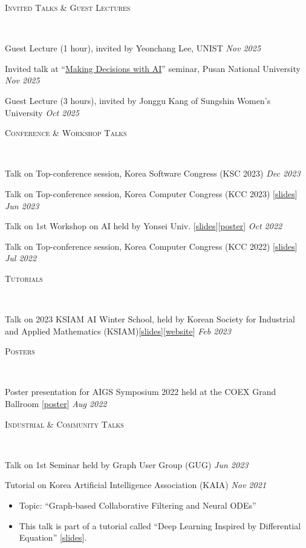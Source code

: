 \documentclass[10pt]{article}
\newenvironment{changemargin}[2]{
  \begin{list}{}{
    \setlength{\topsep}{0pt}
    \setlength{\leftmargin}{#1}
    \setlength{\rightmargin}{#2}
    \setlength{\listparindent}{\parindent}
    \setlength{\itemindent}{\parindent}
    \setlength{\parsep}{\parskip}
  }
  \item[]}{\end{list}
}
\newcommand{\lineover}{
	\begin{changemargin}{-0.05in}{-0.05in}
		\vspace*{-8pt}
		\hrulefill \\
		\vspace*{-2pt}
	\end{changemargin}
}
\newcommand{\award}[2]{
	{#1} \hfill \emph{#2}\\ \medskip
}
\newenvironment{body} {
	\vspace*{-16pt}
	\begin{changemargin}{-0.25in}{-0.5in}
  }
	{\end{changemargin}
}
\begin{document}
\begin{body}
\vspace{14pt}
\textsc{Invited Talks \& Guest Lectures
}
\lineover
\vspace{0.5em}

\award{Guest Lecture (1 hour), invited by Yeonchang Lee, UNIST} {Nov 2025}
\award{Invited talk at ``\href{https://pnu-ds.github.io}{Making Decisions with AI}'' seminar, Pusan National University} {Nov 2025}
\award{Guest Lecture (3 hours), invited by Jonggu Kang of Sungshin Women’s University} {Oct 2025}

\vspace{0.5em}
\textsc{Conference \& Workshop Talks}
\lineover
\vspace{0.5em}
\award{Talk on Top-conference session, Korea Software Congress (KSC 2023)} {Dec 2023}
\award{Talk on Top-conference session, Korea Computer Congress (KCC 2023) [\href{https://www.dropbox.com/s/34h6pmr7ftdiuzr/BSPM-KCC23.pptx?dl=0}{slides}]}{Jun 2023}
\award{Talk on 1st Workshop on AI held by Yonsei Univ. [\href{https://www.dropbox.com/s/9au5xx13qa2l529/AAAI22_workshop.pdf?dl=0}{slides}][\href{https://www.dropbox.com/s/pibzd51d76zy907/AAAI22-Yonsei_AI_Workshop.pdf?dl=0}{poster}]}{Oct 2022}
\award{Talk on Top-conference session, Korea Computer Congress (KCC 2022) [\href{https://www.dropbox.com/s/22d9d92ns8uv9qw/AAAI22_KCC22.pdf?dl=0}{slides}]}{Jul 2022}

\vspace{0.5em}
\textsc{Tutorials}
\lineover
\vspace{0.5em}
\award{Talk on 2023 KSIAM AI Winter School, held by Korean Society for Industrial and Applied Mathematics (KSIAM)[\href{https://www.dropbox.com/s/p4sd5h40hcuxcob/KSIAM23-Tutorial-ODE-RecSys.pdf?dl=0}{slides}][\href{https://ksiam.org/Conference/ConferenceView.asp?AC=3&CODE=CD20230101&CpPage=\#CONF}{website}]}{Feb 2023}

\vspace{0.5em}
\textsc{Posters}
\lineover
\vspace{0.5em}
\award{Poster presentation for AIGS Symposium 2022 held at the COEX Grand Ballroom [\href{https://www.dropbox.com/s/gfjsizak9s4cn9o/AAAI22-AIGS.pdf?dl=0}{poster}]}{Aug 2022}

\vspace{0.5em}
\textsc{Industrial \& Community Talks}
\lineover
\vspace{0.5em}
\award{Talk on 1st Seminar held by Graph User Group (GUG)}{Jun 2023}
\award{Tutorial on Korea Artificial Intelligence Association (KAIA)}{Nov 2021}
	\begin{itemize} \itemsep -0pt  %
        \item Topic: ``Graph-based Collaborative Filtering and Neural ODEs''
		\item This talk is part of a tutorial called ``Deep Learning Inspired by Differential Equation'' [\href{https://www.dropbox.com/s/1xn8xhd6llmhblz/%5BKAIA2021%5DTutorial-LT-OCF.pdf?dl=0}{slides}].
  	\end{itemize}

\end{body}
\end{document}
